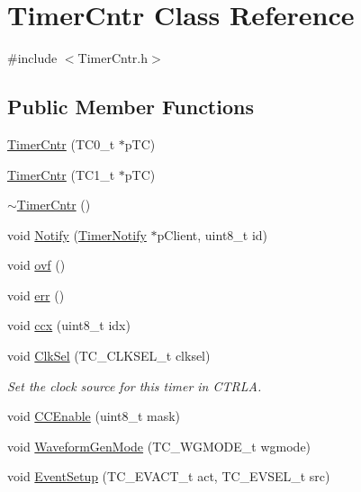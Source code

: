 \hypertarget{class_timer_cntr}{
\section{TimerCntr Class Reference}
\label{class_timer_cntr}
}


{\ttfamily \#include $<$TimerCntr.h$>$}

\subsection*{Public Member Functions}
\begin{DoxyCompactItemize}
\item 
\hyperlink{class_timer_cntr_ad03f5cb857585c26d62eee0667a3c37c}{TimerCntr} (TC0\_\-t $\ast$pTC)
\item 
\hyperlink{class_timer_cntr_a250ce8e521da601255ec0b631370a47c}{TimerCntr} (TC1\_\-t $\ast$pTC)
\item 
\hyperlink{class_timer_cntr_a5b19cb68e0fc19361854553031161544}{$\sim$TimerCntr} ()
\item 
void \hyperlink{class_timer_cntr_a71bf73ee43e8d344d1241695b553556b}{Notify} (\hyperlink{class_timer_notify}{TimerNotify} $\ast$pClient, uint8\_\-t id)
\item 
void \hyperlink{class_timer_cntr_ac2a4b19dfdb9f873075f405f242df698}{ovf} ()
\item 
void \hyperlink{class_timer_cntr_a98d639cbcb4ed28a75309870ae891d58}{err} ()
\item 
void \hyperlink{class_timer_cntr_a1966661facfcb11382471a214191d3f0}{ccx} (uint8\_\-t idx)
\item 
void \hyperlink{class_timer_cntr_a6e5c896a3f85311e011ee552534f1032}{ClkSel} (TC\_\-CLKSEL\_\-t clksel)
\begin{DoxyCompactList}\small\item\em Set the clock source for this timer in CTRLA. \item\end{DoxyCompactList}\item 
void \hyperlink{class_timer_cntr_a7c3e5ae54af9a3431050d623d508cd2c}{CCEnable} (uint8\_\-t mask)
\item 
void \hyperlink{class_timer_cntr_ab5df59d94a8d1706f9282a695e43a9a1}{WaveformGenMode} (TC\_\-WGMODE\_\-t wgmode)
\item 
void \hyperlink{class_timer_cntr_a27f54d05be459f37793e98743325a614}{EventSetup} (TC\_\-EVACT\_\-t act, TC\_\-EVSEL\_\-t src)
\item 

\end{DoxyCompactItemize}
